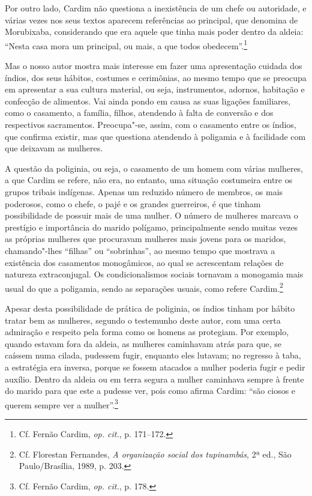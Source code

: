  Por outro lado, Cardim não questiona a inexistência de um
chefe ou autoridade, e várias vezes nos seus textos aparecem
referências ao principal, que denomina de Morubixaba,
considerando que era aquele que tinha mais poder dentro da aldeia:
``Nesta casa mora um principal, ou mais, a que todos
obedecem''.\footnote{ Cf. Fernão Cardim, \textit{op. cit.}, p. 171--172.}

Mas o nosso autor mostra mais interesse em fazer uma apresentação
cuidada dos índios, dos seus hábitos, costumes e cerimônias, ao mesmo
tempo que se preocupa em apresentar a sua cultura material, ou seja,
instrumentos, adornos, habitação e confecção de alimentos. Vai ainda
pondo em causa as suas ligações familiares, como o casamento, a
família, filhos, atendendo à falta de conversão e dos respectivos
sacramentos. Preocupa"-se, assim, com o casamento entre os índios, que
confirma existir, mas que questiona atendendo à poligamia e à
facilidade com que deixavam as mulheres.

A questão da poliginia, ou seja, o casamento de um homem com
várias mulheres, a que Cardim se refere, não era, no entanto, uma
situação costumeira entre os grupos tribais indígenas. Apenas um
reduzido número de membros, os mais poderosos, como o chefe, o pajé e
os grandes guerreiros, é que tinham possibilidade de possuir mais de uma
mulher. O número de mulheres marcava o prestígio e importância do
marido polígamo, principalmente sendo muitas vezes as próprias mulheres
que procuravam mulheres mais jovens para os maridos, chamando"-lhes
``filhas'' ou ``sobrinhas'', ao mesmo tempo que mostrava a existência dos
casamentos monogâmicos, ao qual se acrescentam relações de natureza
extraconjugal. Os condicionalismos sociais tornavam a monogamia mais
usual do que a poligamia, sendo as separações usuais, como refere
Cardim.\footnote{ Cf. Florestan Fernandes, \textit{A organização
social dos tupinambás}, 2ª ed., São Paulo/Brasília, 1989, p. 203.}

Apesar desta possibilidade de prática de poliginia, os índios tinham
por hábito tratar bem as mulheres, segundo o testemunho deste autor,
com uma certa admiração e respeito pela forma como os homens as
protegiam. Por exemplo, quando estavam fora da aldeia, as mulheres
caminhavam atrás para que, se caíssem numa cilada, pudessem fugir,
enquanto eles lutavam; no regresso à taba, a estratégia era inversa,
porque se fossem atacados a mulher poderia fugir e pedir auxílio.
Dentro da aldeia ou em terra segura a mulher caminhava sempre à frente
do marido para que este a pudesse ver, pois como afirma Cardim:
``são ciosos e querem sempre ver a 
mulher''.\footnote{ Cf. Fernão Cardim, \textit{op. cit.}, p. 178.} 

